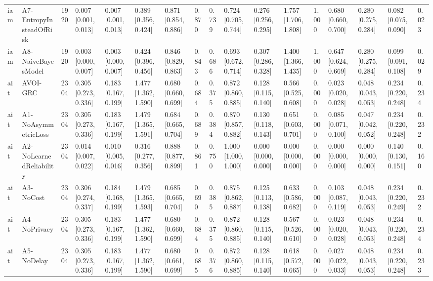 \begin{table}[!ht]
{\begin{tabular}{lllllllllllllllll}
iam & A7-EntropyInsteadOfRisk & 1920 & 0.007 [0.001, 0.013] & 0.007 [0.001, 0.013] & 0.389 [0.356, 0.424] & 0.871 [0.854, 0.886] & 0.870 & 0.739 & 0.724 [0.705, 0.744] & 0.276 [0.256, 0.295] & 1.757 [1.706, 1.808] & 1.000 & 0.680 [0.660, 0.700] & 0.280 [0.275, 0.284] & 0.082 [0.075, 0.090] & 0.023 \\
iam & A8-NaiveBayesModel & 1920 & 0.003 [0.000, 0.007] & 0.003 [0.000, 0.007] & 0.424 [0.396, 0.456] & 0.846 [0.829, 0.863] & 0.843 & 0.686 & 0.693 [0.672, 0.714] & 0.307 [0.286, 0.328] & 1.400 [1.366, 1.435] & 1.000 & 0.647 [0.624, 0.669] & 0.280 [0.275, 0.284] & 0.099 [0.091, 0.108] & 0.029 \\
ait & AVOI-GRC & 2304 & 0.305 [0.273, 0.336] & 0.183 [0.167, 0.199] & 1.477 [1.362, 1.590] & 0.680 [0.660, 0.699] & 0.684 & 0.375 & 0.872 [0.860, 0.885] & 0.128 [0.115, 0.140] & 0.566 [0.525, 0.608] & 0.000 & 0.023 [0.020, 0.028] & 0.048 [0.043, 0.053] & 0.234 [0.220, 0.248] & 0.234 \\
ait & A1-NoAsymmetricLoss & 2304 & 0.305 [0.273, 0.336] & 0.183 [0.167, 0.199] & 1.479 [1.365, 1.591] & 0.684 [0.665, 0.704] & 0.689 & 0.384 & 0.870 [0.857, 0.882] & 0.130 [0.118, 0.143] & 0.651 [0.603, 0.701] & 0.000 & 0.085 [0.071, 0.100] & 0.047 [0.042, 0.052] & 0.234 [0.220, 0.248] & 0.232 \\
ait & A2-NoLearnedReliability & 2304 & 0.014 [0.007, 0.022] & 0.010 [0.005, 0.016] & 0.316 [0.277, 0.356] & 0.888 [0.877, 0.899] & 0.861 & 0.750 & 1.000 [1.000, 1.000] & 0.000 [0.000, 0.000] & 0.000 [0.000, 0.000] & 0.000 & 0.000 [0.000, 0.000] & 0.000 [0.000, 0.000] & 0.140 [0.130, 0.151] & 0.160 \\
ait & A3-NoCost & 2304 & 0.306 [0.274, 0.337] & 0.184 [0.168, 0.199] & 1.479 [1.365, 1.593] & 0.685 [0.665, 0.704] & 0.690 & 0.385 & 0.875 [0.862, 0.887] & 0.125 [0.113, 0.138] & 0.633 [0.586, 0.682] & 0.000 & 0.103 [0.087, 0.119] & 0.048 [0.043, 0.053] & 0.234 [0.220, 0.249] & 0.232 \\
ait & A4-NoPrivacy & 2304 & 0.305 [0.273, 0.336] & 0.183 [0.167, 0.199] & 1.477 [1.362, 1.590] & 0.680 [0.660, 0.699] & 0.684 & 0.375 & 0.872 [0.860, 0.885] & 0.128 [0.115, 0.140] & 0.567 [0.526, 0.610] & 0.000 & 0.023 [0.020, 0.028] & 0.048 [0.043, 0.053] & 0.234 [0.220, 0.248] & 0.234 \\
ait & A5-NoDelay & 2304 & 0.305 [0.273, 0.336] & 0.183 [0.167, 0.199] & 1.477 [1.362, 1.590] & 0.680 [0.661, 0.699] & 0.685 & 0.376 & 0.872 [0.860, 0.885] & 0.128 [0.115, 0.140] & 0.618 [0.572, 0.665] & 0.000 & 0.027 [0.022, 0.033] & 0.048 [0.043, 0.053] & 0.234 [0.220, 0.248] & 0.233 \\

\end{tabular}}
\end{table}

